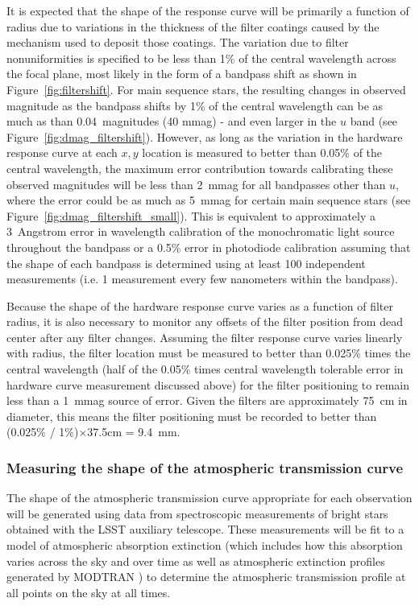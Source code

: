 \documentclass[12pt,preprint]{aastex}
\begin{document}
It is expected that the shape
of the response curve will be primarily a function of radius due to
variations in the thickness of the filter coatings caused by the
mechanism used to deposit those coatings. The variation due to filter
nonuniformities is specified to be less than 1\% of the central wavelength across the focal
plane, most likely in the form of a bandpass shift as shown in
Figure~\ref{fig:filtershift}. For main sequence stars, the resulting
changes in observed magnitude as the bandpass shifts by 1\% of the
central wavelength can be as much as than 0.04~magnitudes (40
mmag) - and even larger in the $u$ band (see
Figure~\ref{fig:dmag_filtershift}). However, as long as the variation
in the hardware response curve at each $x,y$ location is measured to
better than 0.05\% of the central wavelength, the maximum error contribution towards calibrating these observed magnitudes
will be less than 2~mmag for all bandpasses other than $u$, where the
error could be as much as 5~mmag for certain main sequence stars (see
Figure~\ref{fig:dmag_filtershift_small}). This is
equivalent to approximately a 3~Angstrom error in wavelength
calibration of the monochromatic light source throughout the bandpass
or a 0.5\% error in photodiode calibration assuming that the shape of
each bandpass is determined using at least 100 independent
measurements (i.e. 1 measurement every few nanometers within the bandpass).

Because the shape of the hardware response curve varies as a function
of filter radius, it is also necessary to monitor any offsets of the
filter position from dead center after any filter changes. Assuming
the filter response curve varies linearly with radius, the filter
location must be measured to better than 0.025\% times the central
wavelength (half of the 0.05\% times central wavelength tolerable
error in hardware curve measurement discussed above) for the filter
positioning to remain less than a 1~mmag source of error.  Given the filters are approximately
75~cm in diameter, this means the filter positioning must be recorded
to better than (0.025\% / 1\%)$\times$37.5cm = 9.4~mm. 

\subsubsection{Measuring the shape of the atmospheric transmission curve}
\label{sec:atmo_phi}

The shape of the atmospheric transmission curve appropriate for each observation
will be generated using data from spectroscopic measurements of bright
stars obtained with the LSST auxiliary telescope. These measurements
will be fit to a model of atmospheric absorption extinction (which includes
how this absorption varies across the sky and over time as well as
atmospheric extinction profiles generated by MODTRAN \citep{modtran4a,
  modtran4b}) to determine
the atmospheric transmission profile at all points on the sky at all
times. 
\end{document}
